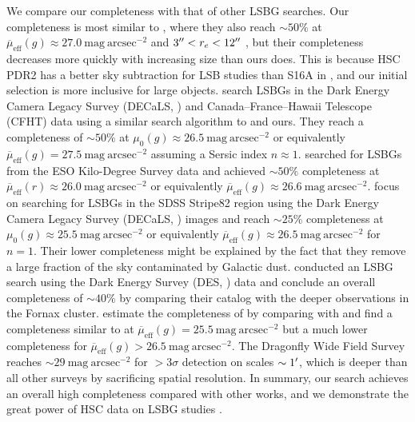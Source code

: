 \documentclass[twocolumn,astrosymb,twocolappendix]{aastex631}
\newcommand{\sbunit}{\mathrm{mag\ arcsec}^{-2}}
\newcommand{\sbeff}{\overline{\mu}_{\mathrm{eff}}(g)}
\newcommand{\sbeffr}{\overline{\mu}_{\mathrm{eff}}(r)}
\begin{document}
\begin{CJK*}{UTF8}{gbsn}
We compare our completeness with that of other LSBG searches. Our completeness is most similar to , where they also reach $\sim 50\%$ at $\sbeff \approx 27.0\ \sbunit$ and $3\mbox{$^{\prime\prime}$} < r_e < 12\mbox{$^{\prime\prime}$}$ \citep{Kado-Fong2021,Greene2022}, but their completeness decreases more quickly with increasing size than ours does. This is because HSC PDR2 has a better sky subtraction for LSB studies than S16A in , and our initial selection is more inclusive for large objects. \citet{CarlstenELVES2022} search LSBGs in the Dark Energy Camera Legacy Survey (DECaLS, \citealt{Dey2019}) and Canada–France–Hawaii Telescope (CFHT) data using a similar search algorithm to  and ours. They reach a completeness of $\sim 50\%$ at $\mu_0(g)\approx 26.5\ \sbunit$ or equivalently $\sbeff = 27.5\ \sbunit$ assuming a Sersic index $n \approx 1$. \citet{vdBurg2017} searched for LSBGs from the ESO Kilo-Degree Survey data and achieved $\sim 50\%$ completeness at $\sbeffr\approx 26.0\ \sbunit$ or equivalently $\sbeff \approx 26.6\ \sbunit$. \citet{Zaritsky2021} focus on searching for LSBGs in the SDSS Stripe82 region using the Dark Energy Camera Legacy Survey (DECaLS, \citealt{Dey2019}) images and reach $\sim 25\%$ completeness at $\mu_{0}(g) \approx 25.5\ \sbunit$ or equivalently $\sbeff \approx 26.5\ \sbunit$ for $n=1$. Their lower completeness might be explained by the fact that they remove a large fraction of the sky contaminated by Galactic dust. \citet{Tanoglidis2021} conducted an LSBG search using the Dark Energy Survey (DES, \citealt{Abbot2018}) data and conclude an overall completeness of $\sim 40\%$ by comparing their catalog with the deeper observations in the Fornax cluster. \citet{Kado-Fong2021} estimate the completeness of \citet{Tanoglidis2021} by comparing with  and find a completeness similar to  at $\sbeff = 25.5\ \sbunit$ but a much lower completeness for $\sbeff > 26.5\ \sbunit$. The Dragonfly Wide Field Survey \citep{Danieli2020} reaches $\sim 29\ \sbunit$ for $>3\sigma$ detection on scales $\sim 1\mbox{$^\prime$}$, which is deeper than all other surveys by sacrificing spatial resolution. In summary, our search achieves an overall high completeness compared with other works, and we demonstrate the great power of HSC data on LSBG studies \citep[e.g.,][]{Huang2018,Kado-Fong2018}. 


\end{CJK*}
\end{document}
